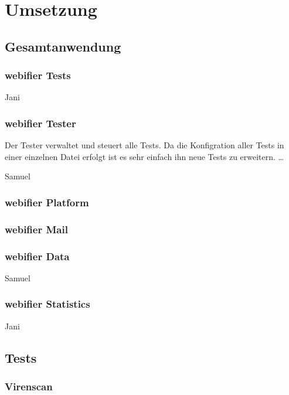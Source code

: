 \chapter{Umsetzung}
\section{Gesamtanwendung}

\subsection{webifier Tests}

\todo Jani

\subsection{webifier Tester}

Der Tester verwaltet und steuert alle Tests. Da die Konfigration aller Tests in einer einzelnen Datei erfolgt ist es sehr einfach ihn neue Tests zu erweitern. \ldots

\todo Samuel

\subsection{webifier Platform}


\subsection{webifier Mail}


\subsection{webifier Data}

\todo Samuel

\subsection{webifier Statistics}

\todo Jani

\section{Tests}

\subsection{Virenscan}

